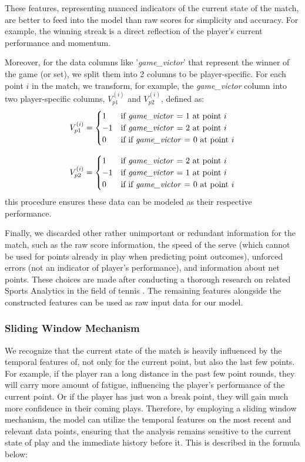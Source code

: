 \documentclass[12pt]{article}  %
\begin{document}
These features, representing nuanced indicators of the current state of the match, are better to feed into the model than raw scores for simplicity and accuracy. For example, the winning streak is a direct reflection of the player's current performance and momentum.

Moreover, for the data columns like '\textit{game\_victor}' that represent the winner of the game (or set), we split them into 2 columns to be player-specific. For each point \( i \) in the match, we transform, for example, the \textit{game\_victor} column into two player-specific columns, \( V_{p1}^{(i)} \) and \( V_{p2}^{(i)} \), defined as:
\[
V_{p1}^{(i)} = 
\begin{cases} 
	1 & \text{if \textit{game\_victor} = 1 at point } i  \\
	-1 & \text{if \textit{game\_victor} = 2 at point } i \\
	0 & \text{if if \textit{game\_victor} = 0 at point } i
\end{cases}
\]

\[
V_{p2}^{(i)} = 
\begin{cases} 
	1 & \text{if \textit{game\_victor} = 2 at point } i \\
	-1 & \text{if \textit{game\_victor} = 1 at point } i \\
	0 & \text{if if \textit{game\_victor} = 0 at point } i
\end{cases}
\]
this procedure ensures these data can be modeled as their respective performance.  

Finally, we discarded other rather unimportant or redundant information for the match, such as the raw score information, the speed of the serve (which cannot be used for points already in play when predicting point outcomes), unforced errors (not an indicator of player's performance), and information about net points. These choices are made after conducting a thorough research on related Sports Analytics in the field of tennis \cite{2}\cite{3}\cite{4}. The remaining features alongside the constructed features can be used as raw input data for our model.

\subsubsection{Sliding Window Mechanism}
We recognize that the current state of the match is heavily influenced by the temporal features of, not only for the current point, but also the last few points. For example, if the player ran a long distance in the past few point rounds, they will carry more amount of fatigue, influencing the player's performance of the current point. Or if the player has just won a break point, they will gain much more confidence in their coming plays. Therefore, by employing a sliding window mechanism, the model can utilize the temporal features on the most recent and relevant data points, ensuring that the analysis remains sensitive to the current state of play and the immediate history before it. This is described in the formula below:
\end{document}
